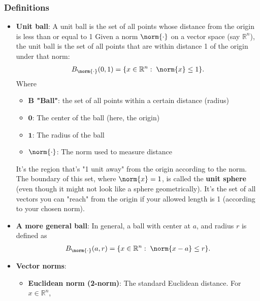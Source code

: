 \documentclass{report}
\begin{document}
    \subsubsection{Definitions}
    \begin{itemize}
        \item \textbf{Unit ball}: A unit ball is the set of all points whose distance from the origin is less than or equal to 1
            \bigbreak \noindent 
            Given a norm $\norm{\cdot}$ on a vector space (say $\mathbb{R}^{n}$), the unit ball is the set of all points that are within distance 1 of the origin under that norm:
            \begin{align*}
                B_{\norm{\cdot }}(0,1) = \{x \in \mathbb{R}^{n}:\; \norm{x} \leq 1\}
            .\end{align*}
            Where
            \begin{itemize}
                \item \textbf{B	"Ball"}: the set of all points within a certain distance (radius)
                \item \textbf{$\mathbf{0}$}: The center of the ball (here, the origin)
                \item $\mathbf{1}$:	The radius of the ball
                \item $\norm{\cdot}$: The norm used to measure distance
            \end{itemize}
            \bigbreak \noindent 
            It’s the region that's "1 unit away" from the origin according to the norm.
            \bigbreak \noindent 
            The boundary of this set, where $\norm{x} = 1$, is called the \textbf{unit sphere} (even though it might not look like a sphere geometrically).
            \bigbreak \noindent 
            It’s the set of all vectors you can "reach" from the origin if your allowed length is 1 (according to your chosen norm).
        \item \textbf{A more general ball}: In general, a ball with center at $a$, and radius $r$ is defined as 
            \begin{align*}
                B_{\norm{\cdot }}(a,r) = \{x \in \mathbb{R}^{n}:\; \norm{x-a} \leq r\}
            .\end{align*}
        \item \textbf{Vector norms}:
            \begin{itemize}
                \item \textbf{Euclidean norm (2-norm)}: The standard Euclidean distance. For $x \in \mathbb{R}^{n}$,

\end{itemize}
\end{itemize}
\end{document}
